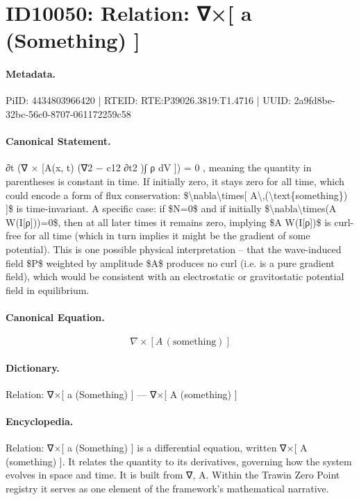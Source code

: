 \section*{ID10050: Relation: ∇×[ a (Something) ]}
\paragraph{Metadata.}
PiID: 4434803966420 | RTEID: RTE:P39026.3819:T1.4716 | UUID: 2a9fd8be-32bc-56c0-8707-061172259c58

\paragraph{Canonical Statement.}
∂t (∇ × [A(x, t) (∇2 − c12 ∂t2 )∫ ρ dV ]) = 0 , meaning the quantity in parentheses is constant in time. If initially zero, it stays zero for all time, which could encode a form of flux conservation: \$\textbackslash{}nabla\textbackslash{}times[ A\textbackslash{},(\textbackslash{}text\{something\}) ]\$ is time-invariant. A specific case: if \$N=0\$ and if initially \$\textbackslash{}nabla\textbackslash{}times(A W(I[ρ]))=0\$, then at all later times it remains zero, implying \$A W(I[ρ])\$ is curl-free for all time (which in turn implies it might be the gradient of some potential). This is one possible physical interpretation – that the wave-induced field \$P\$ weighted by amplitude \$A\$ produces no curl (i.e. is a pure gradient field), which would be consistent with an electrostatic or gravitostatic potential field in equilibrium.

\paragraph{Canonical Equation.}
\[
\nabla\times[ A\,(\text{something}) ]
\]

\paragraph{Dictionary.}
Relation: ∇×[ a (Something) ] — ∇×[ A (something) ]

\paragraph{Encyclopedia.}
Relation: ∇×[ a (Something) ] is a differential equation, written ∇×[ A (something) ]. It relates the quantity to its derivatives, governing how the system evolves in space and time. It is built from ∇, A. Within the Trawin Zero Point registry it serves as one element of the framework's mathematical narrative.
